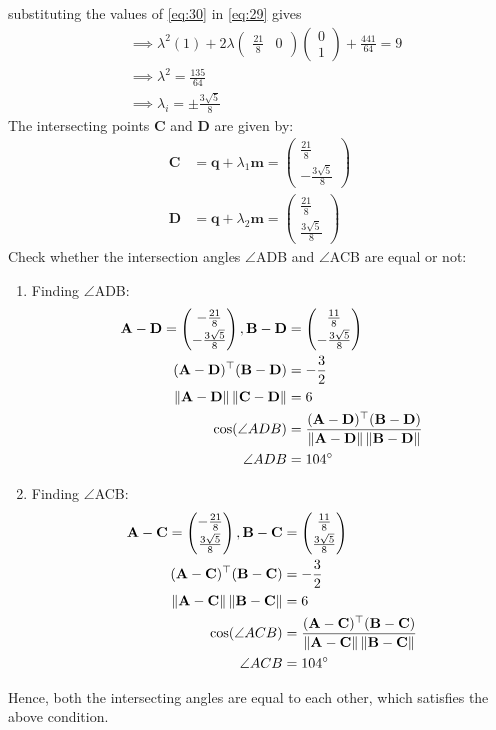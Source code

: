\documentclass[12pt]{article}
\providecommand{\norm}[1]{\left\lVert#1\right\rVert}
\newcommand{\myvec}[1]{\ensuremath{\begin{pmatrix}#1\end{pmatrix}}}
\let\vec\mathbf
\let\vec\mathbf
\providecommand{\norm}[1]{\left\lVert#1\right\rVert}
\let\vec\mathbf
\begin{document}
		substituting the values of \eqref{eq:30} in \eqref{eq:29} gives
\begin{align}
	&\implies\lambda^2(1)+2\lambda\myvec{\frac{21}{8}&0}\myvec{0\\1}+\frac{441}{64}=9\\
	&\implies\lambda^2=\frac{135}{64}\\
	&\implies\lambda_i=\pm\frac{3\sqrt{5}}{8}
\end{align}
The intersecting points $\vec{C}$ and $\vec{D}$ are given by:
\begin{align}
    \vec{C}&=\vec{q}+\lambda_1\vec{m}=\myvec{\frac{21}{8}\\[2pt]-\frac{3\sqrt{5}}{8}}\\
    \vec{D}&=\vec{q}+\lambda_2\vec{m}=\myvec{\frac{21}{8}\\[2pt]\frac{3\sqrt{5}}{8}}
\end{align}
		Check whether the intersection angles $\angle$ADB and $\angle$ACB are equal or not:
\begin{enumerate}
\item Finding $\angle$ADB:
	\begin{align}
		 \vec{A-D} = \myvec{-\frac{21}{8}\\[2pt]-\frac{3\sqrt{5}}{8}},
		\vec{B-D}& = \myvec{\frac{11}{8}\\[2pt]-\frac{3\sqrt{5}}{8}}\\
	 \vec{(A-D)^\top(B-D)}&= -\frac{3}{2}\\
	 \norm{\vec{A-D}}\norm{\vec{C-D}}& = 6\\
		\cos(\angle ADB)& = \frac{\vec{(A-D)^\top(B-D)}}{\norm{\vec{A-D}}\norm{\vec{B-D}}}\\
		\angle ADB&=104\degree
\end{align}
\item Finding $\angle$ACB:
\begin{align}
	\vec{A-C} = \myvec{-\frac{21}{8}\\[2pt]\frac{3\sqrt{5}}{8}},
	 \vec{B-C}& = \myvec{\frac{11}{8}\\[2pt]\frac{3\sqrt{5}}{8}}\\
	 \vec{(A-C)^\top(B-C)}&= -\frac{3}{2}\\
	 \norm{\vec{A-C}}\norm{\vec{B-C}}& = 6\\
	 \cos(\angle ACB) &= \frac{\vec{(A-C)^\top(B-C)}}{\norm{\vec{A-C}}\norm{\vec{B-C}}}\\
	 \angle ACB&=104\degree
\end{align}
\end{enumerate}
Hence, both the intersecting angles are equal to each other, which satisfies the above condition.
\end{document}
